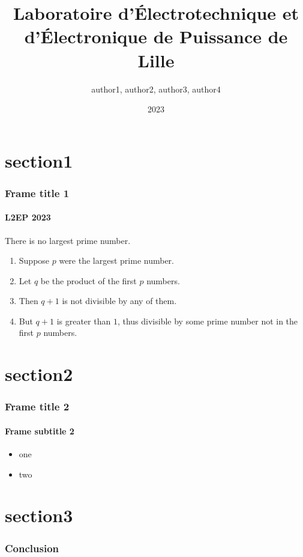 \documentclass{beamer}
\title{\LARGE{\textbf{ Laboratoire d'Électrotechnique et d'Électronique de Puissance de Lille }}}
\date[ISPN ’80]{2023}
\author[Euclid]{author1, author2, author3, author4}
\begin{document}
\begin{frame}[plain]
    \titlepage
\end{frame}



\section{section1}

\begin{frame} 
\frametitle{Frame title 1} 
\framesubtitle{L2EP 2023} 
\begin{theorem}
    There is no largest prime number. 
\end{theorem} 
\begin{enumerate} 
    \item<1-| alert@1> Suppose $p$ were the largest prime number. 
    \item<2-> Let $q$ be the product of the first $p$ numbers. 
    \item<3-> Then $q+1$ is not divisible by any of them. 
    \item<1-> But $q + 1$ is greater than $1$, thus divisible by some prime number not in the first $p$ numbers.
\end{enumerate}
\end{frame}


\section{section2}

\begin{frame}
\frametitle{Frame title 2}
\framesubtitle{Frame subtitle 2} 
\begin{itemize}
    \item one
    \item two
\end{itemize}
\end{frame}


\section{section3}

\begin{frame}
\frametitle{Conclusion} 
\cite{JA,GB,Steinmetz}
\end{frame}


\printbibliography
\end{document}
